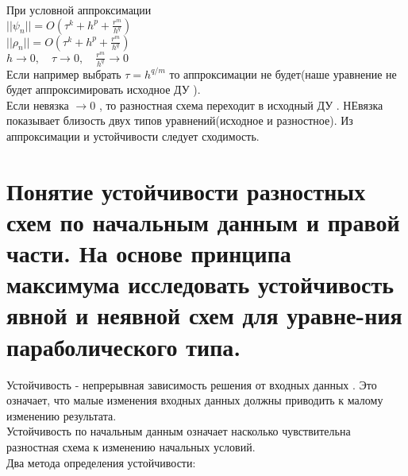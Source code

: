 \documentclass[12pt,a4paper]{article}
\begin{document}
	При условной аппроксимации \\
	$||\psi_n|| = O(\tau^k + h^p + \frac{r^m}{h^q})$\\
	$||\rho_n || = O(\tau^k + h^p + \frac{r^m}{h^q})$\\
	$h \rightarrow 0, \quad \tau \rightarrow 0,\quad\frac{r^m}{h^q} \rightarrow 0 $\\
	Если например выбрать $\tau = h ^{q/m}$ то аппроксимации не будет(наше уравнение не будет аппроксимировать исходное ДУ ).\\
	Если невязка $\rightarrow 0$ , то разностная схема переходит в исходный ДУ . НЕвязка показывает близость двух типов уравнений(исходное и разностное). Из аппроксимации и устойчивости следует сходимость. 
	\section{Понятие устойчивости разностных схем по начальным данным и правой части. На основе принципа максимума исследовать устойчивость явной и неявной схем для уравне-ния параболического типа.}	
	Устойчивость - непрерывная зависимость решения от входных данных . Это означает, что малые изменения входных данных должны приводить к малому изменению результата. \\
	Устойчивость по начальным данным означает насколько чувствительна разностная схема к изменению начальных условий. \\
	Два метода определения устойчивости:
\end{document}
